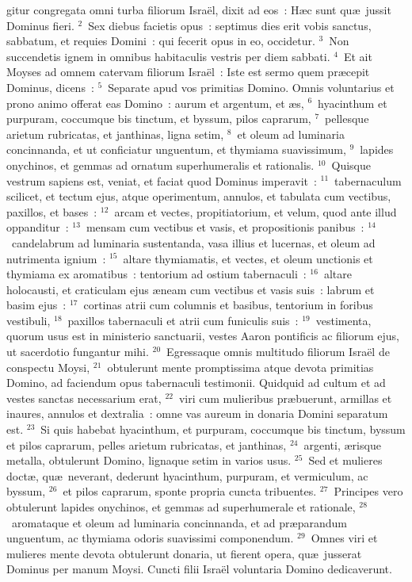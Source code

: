 \bchapter
{}gitur congregata omni turba filiorum Isra\"el, dixit ad eos~: H\ae c sunt qu\ae\ jussit Dominus fieri.
${}^{2}$~Sex diebus facietis opus~: septimus dies erit vobis sanctus, sabbatum, et requies Domini~: qui fecerit opus in eo, occidetur.
${}^{3}$~Non succendetis ignem in omnibus habitaculis vestris per diem sabbati.
${}^{4}$~Et ait Moyses ad omnem catervam filiorum Isra\"el~: Iste est sermo quem pr\ae cepit Dominus, dicens~:
${}^{5}$~Separate apud vos primitias Domino. Omnis voluntarius et prono animo offerat eas Domino~: aurum et argentum, et \ae s,
${}^{6}$~hyacinthum et purpuram, coccumque bis tinctum, et byssum, pilos caprarum,
${}^{7}$~pellesque arietum rubricatas, et janthinas, ligna setim,
${}^{8}$~et oleum ad luminaria concinnanda, et ut conficiatur unguentum, et thymiama suavissimum,
${}^{9}$~lapides onychinos, et gemmas ad ornatum superhumeralis et rationalis.
${}^{10}$~Quisque vestrum sapiens est, veniat, et faciat quod Dominus imperavit~:
${}^{11}$~tabernaculum scilicet, et tectum ejus, atque operimentum, annulos, et tabulata cum vectibus, paxillos, et bases~:
${}^{12}$~arcam et vectes, propitiatorium, et velum, quod ante illud oppanditur~:
${}^{13}$~mensam cum vectibus et vasis, et propositionis panibus~:
${}^{14}$~candelabrum ad luminaria sustentanda, vasa illius et lucernas, et oleum ad nutrimenta ignium~:
${}^{15}$~altare thymiamatis, et vectes, et oleum unctionis et thymiama ex aromatibus~: tentorium ad ostium tabernaculi~:
${}^{16}$~altare holocausti, et craticulam ejus \ae neam cum vectibus et vasis suis~: labrum et basim ejus~:
${}^{17}$~cortinas atrii cum columnis et basibus, tentorium in foribus vestibuli,
${}^{18}$~paxillos tabernaculi et atrii cum funiculis suis~:
${}^{19}$~vestimenta, quorum usus est in ministerio sanctuarii, vestes Aaron pontificis ac filiorum ejus, ut sacerdotio fungantur mihi.
${}^{20}$~Egressaque omnis multitudo filiorum Isra\"el de conspectu Moysi,
${}^{21}$~obtulerunt mente promptissima atque devota primitias Domino, ad faciendum opus tabernaculi testimonii. Quidquid ad cultum et ad vestes sanctas necessarium erat,
${}^{22}$~viri cum mulieribus pr\ae buerunt, armillas et inaures, annulos et dextralia~: omne vas aureum in donaria Domini separatum est.
${}^{23}$~Si quis habebat hyacinthum, et purpuram, coccumque bis tinctum, byssum et pilos caprarum, pelles arietum rubricatas, et janthinas,
${}^{24}$~argenti, \ae risque metalla, obtulerunt Domino, lignaque setim in varios usus.
${}^{25}$~Sed et mulieres doct\ae , qu\ae\ neverant, dederunt hyacinthum, purpuram, et vermiculum, ac byssum,
${}^{26}$~et pilos caprarum, sponte propria cuncta tribuentes.
${}^{27}$~Principes vero obtulerunt lapides onychinos, et gemmas ad superhumerale et rationale,
${}^{28}$~aromataque et oleum ad luminaria concinnanda, et ad pr\ae parandum unguentum, ac thymiama odoris suavissimi componendum.
${}^{29}$~Omnes viri et mulieres mente devota obtulerunt donaria, ut fierent opera, qu\ae\ jusserat Dominus per manum Moysi. Cuncti filii Isra\"el voluntaria Domino dedicaverunt.


